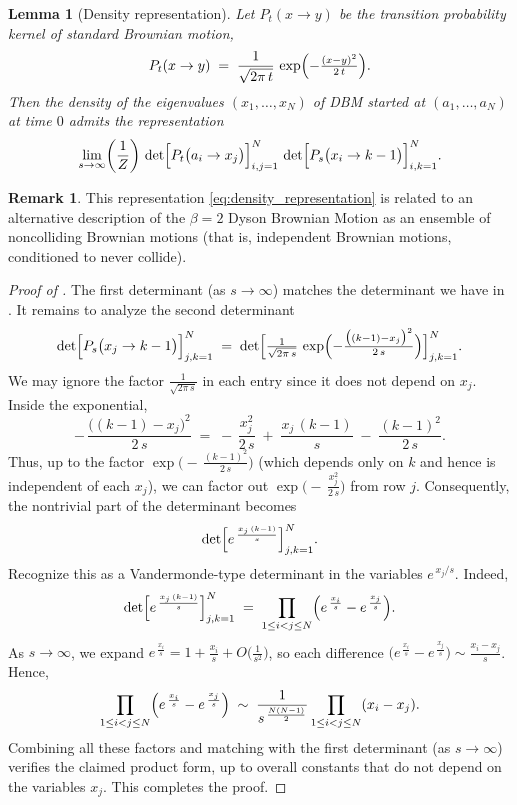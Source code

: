 \documentclass[letterpaper,11pt,oneside,reqno]{article}
\numberwithin{equation}{section}
\newtheorem{lemma}[proposition]{Lemma}
\theoremstyle{definition}
\newtheorem{remark}[proposition]{Remark}
\begin{document}
\begin{lemma}[Density representation]
\label{lem:density_representation}
Let $P_t(x\to y)$ be the transition probability kernel of standard Brownian motion,
\[
   P_t(x\to y) \;=\; \frac{1}{\sqrt{2\pi\,t}}\,
   \exp\Bigl(-\tfrac{(x-y)^2}{2\,t}\Bigr).
\]
Then the density of the eigenvalues $(x_1,\dots,x_N)$
of DBM started at $(a_1,\dots,a_N)$ at time $0$
admits the representation
\begin{equation}
	\label{eq:density_representation}
   \lim_{s\to\infty}
   \biggl(\frac1Z\biggr)\,
   \det\Bigl[P_t\bigl(a_i\to x_j\bigr)\Bigr]_{i,j=1}^N
   \,\det\Bigl[P_s\bigl(x_i\to k-1\bigr)\Bigr]_{i,k=1}^N.
 \end{equation}
\end{lemma}
\begin{remark}
	This representation
	\eqref{eq:density_representation}
	is related to an alternative description of the
	$\beta=2$ Dyson Brownian Motion as
	an ensemble of noncolliding Brownian motions
	(that is, independent Brownian motions, conditioned to never collide).
\end{remark}

\begin{proof}[Proof of ]
The first determinant (as $s\to\infty$) matches the determinant
we have in .
It remains to analyze the second determinant
\[
   \det\Bigl[
      P_s\bigl(x_j \to k-1\bigr)
   \Bigr]_{j,k=1}^N
   \;=\;
   \det\Bigl[
      \tfrac{1}{\sqrt{2\pi\,s}}\,
      \exp\Bigl(-\tfrac{\bigl((k-1) - x_j\bigr)^2}{2\,s}\Bigr)
   \Bigr]_{j,k=1}^N.
\]
We may ignore the factor \(\tfrac{1}{\sqrt{2\pi\,s}}\) in each entry since it does not depend on \(x_j\).  Inside the exponential,
\[
   -\,\frac{\bigl((k-1) - x_j\bigr)^2}{2\,s}
   \;=\;
   -\,\frac{x_j^2}{2\,s}
   \;+\;\frac{x_j\,(k-1)}{s}
   \;-\;\frac{(k-1)^2}{2\,s}.
\]
Thus, up to the factor
\(\exp\bigl(-\,\tfrac{(k-1)^2}{2\,s}\bigr)\)
(which depends only on \(k\) and hence is independent of each \(x_j\)),
we can factor out
\(\exp\bigl(-\,\tfrac{x_j^2}{2\,s}\bigr)\)
from row \(j\).  Consequently, the nontrivial part of the determinant becomes
\[
   \det\Bigl[
      e^{\,\frac{x_j\,(k-1)}{s}}
   \Bigr]_{j,k=1}^N.
\]
Recognize this as a Vandermonde-type determinant in the variables \(e^{\,x_j/s}\).  Indeed,
\[
   \det\Bigl[
      e^{\,\frac{x_j\,(k-1)}{s}}
   \Bigr]_{j,k=1}^N
   \;=\;
   \prod_{1 \le i<j \le N}
   \Bigl(e^{\,\frac{x_i}{s}} - e^{\,\frac{x_j}{s}}\Bigr).
\]
As \(s \to \infty\), we expand
\(e^{\,\frac{x_i}{s}} = 1 + \frac{x_i}{s} + O\bigl(\tfrac{1}{s^2}\bigr)\),
so each difference
\(\bigl(e^{\,\frac{x_i}{s}} - e^{\,\frac{x_j}{s}}\bigr)
 \sim \tfrac{x_i - x_j}{s}\).
Hence,
\[
   \prod_{1 \le i<j \le N}
   \Bigl(e^{\,\frac{x_i}{s}} - e^{\,\frac{x_j}{s}}\Bigr)
   \;\sim\;
   \frac{1}{s^{\,\frac{N(N-1)}{2}}}
   \prod_{1 \le i<j \le N} (x_i - x_j).
\]
Combining all these factors and matching with the first determinant (as $s\to\infty$) verifies the claimed product form, up to overall constants that do not depend on the variables \(x_j\).  This completes the proof.
\end{proof}
\end{document}
